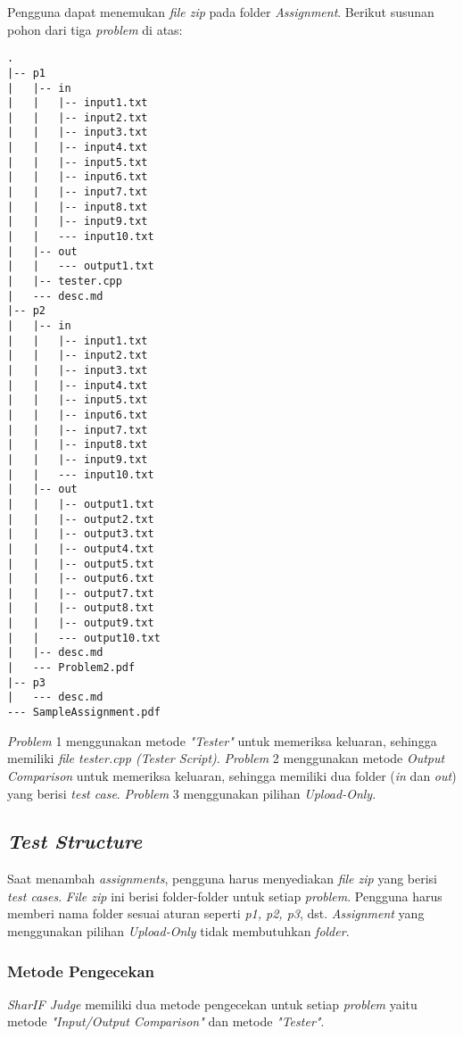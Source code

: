 Pengguna dapat menemukan \textit{file zip} pada folder \textit{Assignment}. Berikut susunan pohon dari tiga \textit{problem} di atas:

\begin{lstlisting}[basicstyle=\ttfamily, frame=single,
columns=fullflexible, keepspaces=true, breaklines=true, label=ls:8]
.
|-- p1
|   |-- in
|   |   |-- input1.txt
|   |   |-- input2.txt
|   |   |-- input3.txt
|   |   |-- input4.txt
|   |   |-- input5.txt
|   |   |-- input6.txt
|   |   |-- input7.txt
|   |   |-- input8.txt
|   |   |-- input9.txt
|   |   --- input10.txt
|   |-- out
|   |   --- output1.txt
|   |-- tester.cpp
|   --- desc.md
|-- p2
|   |-- in
|   |   |-- input1.txt
|   |   |-- input2.txt
|   |   |-- input3.txt
|   |   |-- input4.txt
|   |   |-- input5.txt
|   |   |-- input6.txt
|   |   |-- input7.txt
|   |   |-- input8.txt
|   |   |-- input9.txt
|   |   --- input10.txt
|   |-- out
|   |   |-- output1.txt
|   |   |-- output2.txt
|   |   |-- output3.txt
|   |   |-- output4.txt
|   |   |-- output5.txt
|   |   |-- output6.txt
|   |   |-- output7.txt
|   |   |-- output8.txt
|   |   |-- output9.txt
|   |   --- output10.txt
|   |-- desc.md
|   --- Problem2.pdf
|-- p3
|   --- desc.md
--- SampleAssignment.pdf
\end{lstlisting}

\textit{Problem} 1 menggunakan metode \textit{"Tester"} untuk memeriksa keluaran, sehingga memiliki \textit{file tester.cpp (Tester Script)}. \textit{Problem} 2 menggunakan metode \textit{Output Comparison} untuk memeriksa keluaran, sehingga memiliki dua folder (\textit{in} dan \textit{out}) yang berisi \textit{test case}. \textit{Problem} 3 menggunakan pilihan \textit{Upload-Only}.

\subsection{\textit{Test Structure}}
\label{sec:test_structure}
Saat menambah \textit{assignments}, pengguna harus menyediakan \textit{file zip} yang berisi \textit{test cases}. \textit{File zip} ini berisi folder-folder untuk setiap \textit{problem}. Pengguna harus memberi nama folder sesuai aturan seperti \textit{p1, p2, p3}, dst. \textit{Assignment} yang menggunakan pilihan \textit{Upload-Only} tidak membutuhkan \textit{folder}.

\subsubsection{Metode Pengecekan}
\label{sec:metode_pengecekan}
\textit{SharIF Judge} memiliki dua metode pengecekan untuk setiap \textit{problem} yaitu metode \textit{"Input/Output Comparison"} dan metode \textit{"Tester"}.

